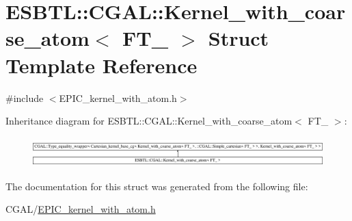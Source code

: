 \hypertarget{structESBTL_1_1CGAL_1_1Kernel__with__coarse__atom}{}\section{E\+S\+B\+TL\+:\+:C\+G\+AL\+:\+:Kernel\+\_\+with\+\_\+coarse\+\_\+atom$<$ F\+T\+\_\+ $>$ Struct Template Reference}
\label{structESBTL_1_1CGAL_1_1Kernel__with__coarse__atom}


{\ttfamily \#include $<$E\+P\+I\+C\+\_\+kernel\+\_\+with\+\_\+atom.\+h$>$}

Inheritance diagram for E\+S\+B\+TL\+:\+:C\+G\+AL\+:\+:Kernel\+\_\+with\+\_\+coarse\+\_\+atom$<$ F\+T\+\_\+ $>$\+:\begin{figure}[H]
\begin{center}
\leavevmode
\includegraphics[height=1.144024cm]{structESBTL_1_1CGAL_1_1Kernel__with__coarse__atom}
\end{center}
\end{figure}


The documentation for this struct was generated from the following file\+:\begin{DoxyCompactItemize}
\item 
C\+G\+A\+L/\hyperlink{EPIC__kernel__with__atom_8h}{E\+P\+I\+C\+\_\+kernel\+\_\+with\+\_\+atom.\+h}\end{DoxyCompactItemize}
